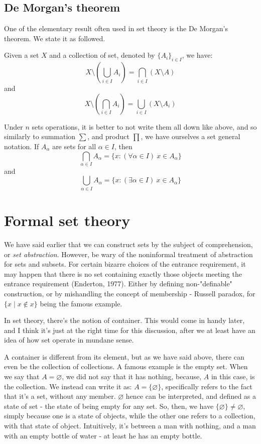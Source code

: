 \subsection{De Morgan's theorem}
One of the elementary result often used in set theory is the De Morgan's theorem. We state it as followed. 
\begin{theorem}[De Morgan]
    Given a set $X$ and a collection of set, denoted by $\{A_i\}_{i\in I}$, we have: 
    \begin{equation}
        X\setminus \left(\bigcup_{i \in I} A_{i}  \right)=\bigcap_{i \in I} (X \setminus A)
    \end{equation}
    and 
    \begin{equation}
        X\setminus\left(\bigcap_{i \in I} A_{i}\right)= \bigcup_{i \in I} (X \setminus A_{i})
    \end{equation}
\end{theorem}
Under $n$ sets operations, it is better to not write them all down like above, and so similarly to summation $\sum$, and product $\prod$, we have ourselves a set general notation. If $A_{\alpha}$ are sets for all $\alpha\in I$, then $$\bigcap_{\alpha\in I}A_{\alpha}=\{ x: (\forall \alpha\in I)\: x\in A_{\alpha} \}$$
and $$\bigcup_{\alpha\in I}A_{\alpha}=\{ x: (\exists \alpha\in I)\: x\in A_{\alpha} \}$$
\section{Formal set theory}
We have said earlier that we can construct sets by the subject of comprehension, or \textit{set abstraction}. However, be wary of the noninformal treatment of abstraction for sets and subsets. For certain bizarre choices of the entrance requirement, it may happen that there is no set containing exactly those objects meeting the entrance requirement (Enderton, 1977). Either by defining non-"definable" construction, or by mishandling the concept of membership - Russell paradox, for $\{x\mid x\not\in x\}$ being the famous example. 

In set theory, there's the notion of container. This would come in handy later, and I think it's just at the right time for this discussion, after we at least have an idea of how set operate in mundane sense. 

A container is different from its element, but as we have said above, there can even be the collection of collections. A famous example is the empty set. When we say that $A=\varnothing$, we did not say that it has nothing, because, $A$ in this case, is the collection. We instead can write it as: $A= \{\varnothing\}$, specifically refers to the fact that it's a set, without any member. $\varnothing$ hence can be interpreted, and defined as a state of set - the state of being empty for any set. So, then, we have $\{\varnothing\}\neq \varnothing$, simply because one is a state of objects, while the other one refers to a collection, with that state of object. Intuitively, it's between a man with nothing, and a man with an empty bottle of water - at least he has an empty bottle. 

